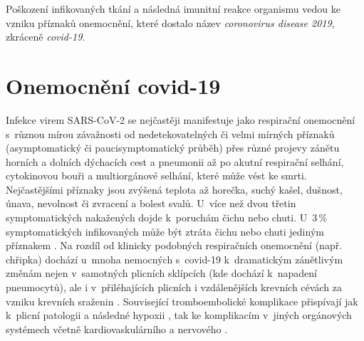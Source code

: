 Poškození infikovaných tkání a následná imunitní reakce organismu vedou ke vzniku příznaků onemocnění, které dostalo název \textit{coronovirus disease 2019}, zkráceně \textit{covid-19}.

\section*{Onemocnění covid-19}

Infekce virem SARS-CoV-2 se nejčastěji manifestuje jako respirační onemocnění s~různou mírou závažnosti od nedetekovatelných či velmi mírných příznaků (asymptomatický či paucisymptomatický průběh) přes různé projevy zánětu horních a dolních dýchacích cest a pneumonii až po akutní respirační selhání, cytokinovou bouři a multiorgánové selhání, které může vést ke smrti. Nejčastějšími příznaky jsou zvýšená teplota až horečka, suchý kašel, dušnost, únava, nevolnost či zvracení a bolest svalů. U~více než dvou třetin symptomatických nakažených dojde k~poruchám čichu nebo chuti. U~3\,\% symptomatických infikovaných může být ztráta čichu nebo chuti jediným příznakem \cite{Xie:2020,Wiersinga:2020}. Na rozdíl od klinicky podobných respiračních onemocnění (např. chřipka) dochází u~mnoha nemocných s~covid-19 k~dramatickým zánětlivým změnám nejen v~samotných plicních sklípcích (kde dochází k~napadení pneumocytů), ale i v~přiléhajících plicních i vzdálenějších krevních cévách za vzniku krevních sraženin \cite{Ackermann:2020}. Související tromboembolické komplikace přispívají jak k~plicní patologii a následné hypoxii \cite{McGonagle:2021}, tak ke komplikacím v~jiných orgánových systémech včetně kardiovaskulárního a nervového \cite{Gupta:2020}.

